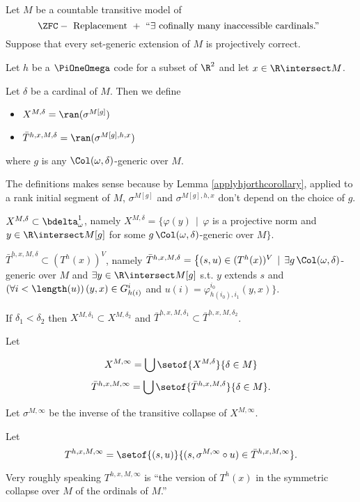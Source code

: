\documentclass[oneside,12pt]{amsart}
\begin{document}
\begin{definition}
\label{TInfinity}
Let $M$ be a countable transitive model of
$$\ZFC - \text{ Replacement } +
\text{ ``} \exists \text{ cofinally many inaccessible cardinals.'' }$$
Suppose that every set-generic extension of $M$ is projectively correct.

Let $h$ be a $\PiOneOmega$ code for a subset
of $\R^2$ and let $x\in\R\intersect M$.


Let $\delta$ be a cardinal of $M$. Then we define
\begin{itemize}
\item $X^{M,\delta} = \ran(\sigma^{M[g]})$
\item $\bar{T}^{h,x,M,\delta}=\ran(\sigma^{M[g],h,x})$
\end{itemize}
where $g$ is any
$\Col(\omega,\delta)$-generic over $M$.

The definitions makes sense because by Lemma \ref{applyhjorthcorollary},
applied to a rank initial segment of $M$,
$\sigma^{M[g]}$ and $\sigma^{M[g],h,x}$ don't depend on the choice of $g$.


$X^{M,\delta}\subset \bdelta^1_{\omega}$, namely
$X^{M,\delta}=\big\{ \varphi(y)\, \mid \, \varphi$ is a projective norm and $y\in\R\intersect M[g]$ for
some $g\, \Col(\omega,\delta)$-generic over $M \big\}$.


$\bar{T}^{h,x,M,\delta}\subset (T^h(x))^{V}$, namely
$\bar{T}^{h,x,M,\delta}=\big\{(s,u)\in (T^h(x))^{V} \, \mid \,
\exists g\, \Col(\omega,\delta)$-generic over $M$ and $\exists y \in \R\intersect M[g]$ s.t.
$y$ extends $s$ and $(\forall i<\length(u))\, (y,x)\in G^{i}_{h(i)}$ and
$u(i)=\varphi^{i_0}_{h(i_0),i_1}(y,x) \big\}$.


If $\delta_1<\delta_2$ then $X^{M,\delta_1}\subset X^{M,\delta_2}$ and
$\bar{T}^{h,x,M,\delta_1}\subset \bar{T}^{h,x,M,\delta_2}$.

Let

$$X^{M,\infty}=\bigcup\setof{X^{M,\delta}}{\delta\in M}$$
$$\bar{T}^{h,x,M,\infty}=\bigcup\setof{\bar{T}^{h,x,M,\delta}}{\delta\in M}.$$

Let $\sigma^{M,\infty}$ be the inverse of the transitive collapse of $X^{M,\infty}$.

Let
$$T^{h,x,M,\infty}=\setof{(s,u)}{(s,\sigma^{M,\infty}\circ u)\in \bar{T}^{h,x,M,\infty}}.$$
\end{definition}

Very roughly speaking $T^{h,x,M,\infty}$ is ``the version of $T^h(x)$ in the symmetric collapse
over $M$ of the ordinals of $M$.''
\end{document}
